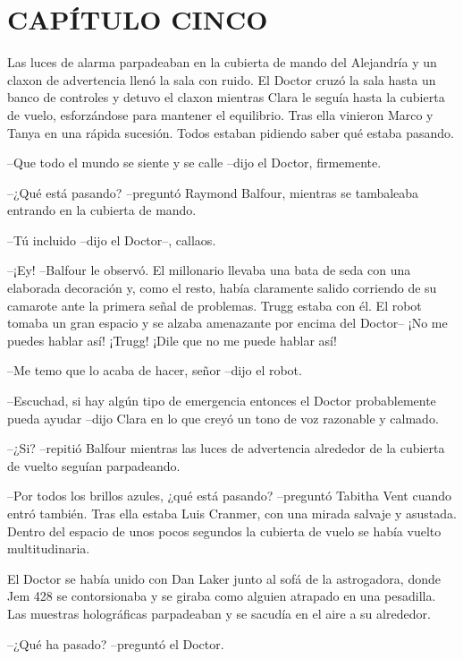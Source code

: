 \chapter*{CAPÍTULO CINCO}

{Las luces de alarma parpadeaban en la cubierta de mando del Alejandría y
 un claxon de advertencia llenó la sala con ruido. El Doctor cruzó la
 sala hasta un banco de controles y detuvo el claxon mientras Clara le
 seguía hasta la cubierta de vuelo, esforzándose para mantener el
 equilibrio. Tras ella vinieron Marco y Tanya en una rápida sucesión.
Todos estaban pidiendo saber qué estaba pasando.}

{--Que todo el mundo se siente y se calle --dijo el Doctor, firmemente.}

{--¿Qué está pasando? --preguntó Raymond Balfour, mientras se tambaleaba
entrando en la cubierta de mando.}

{--Tú incluido --dijo el Doctor--, callaos.}

{--¡Ey! --Balfour le observó. El millonario llevaba una bata de seda con
 una elaborada decoración y, como el resto, había claramente salido
 corriendo de su camarote ante la primera señal de problemas. Trugg
 estaba con él. El robot tomaba un gran espacio y se alzaba amenazante
 por encima del Doctor-- ¡No me puedes hablar así! ¡Trugg! ¡Dile que no
me puede hablar así!}

{--Me temo que lo acaba de hacer, señor --dijo el robot.}

{--Escuchad, si hay algún tipo de emergencia entonces el Doctor
 probablemente pueda ayudar --dijo Clara en lo que creyó un tono de voz
razonable y calmado.}

{--¿Si? --repitió Balfour mientras las luces de advertencia alrededor de
la cubierta de vuelto seguían parpadeando.}

{--Por todos los brillos azules, ¿qué está pasando? --preguntó Tabitha
 Vent cuando entró también. Tras ella estaba Luis Cranmer, con una mirada
 salvaje y asustada. Dentro del espacio de unos pocos segundos la
cubierta de vuelo se había vuelto multitudinaria.}

{El Doctor se había unido con Dan Laker junto al sofá de la astrogadora,
 donde Jem 428 se contorsionaba y se giraba como alguien atrapado en una
 pesadilla. Las muestras holográficas parpadeaban y se sacudía en el aire
a su alrededor.}

{--¿Qué ha pasado? --preguntó el Doctor.}

